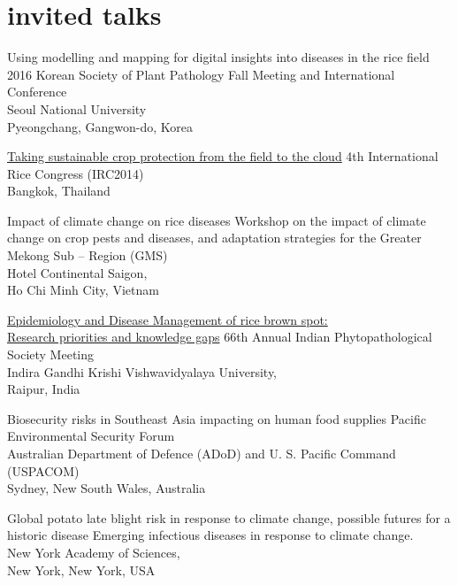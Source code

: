 \section*{invited talks}
\begin{entrylist}
 	{Using modelling and mapping for digital insights into diseases in the rice field}
 	{}
 	{2016 Korean Society of Plant Pathology Fall Meeting and International Conference\\Seoul National University\\Pyeongchang, Gangwon-do, Korea}

	{\href{http://figshare.com/articles/Taking_Sustainable_Crop_Protection_From_the_Field_to_the_Cloud/1225800}{Taking sustainable crop protection from the field to the cloud}}
	{}
	{4th International Rice Congress (IRC2014)\\Bangkok, Thailand}

	{Impact of climate change on rice diseases}
	{}
	{Workshop on the impact of climate change on crop pests and diseases, and adaptation strategies for the Greater Mekong Sub -- Region (GMS)\\Hotel Continental Saigon,\\Ho Chi Minh City, Vietnam}

	{\href{http://figshare.com/articles/IPS_2014/1037569}{Epidemiology and Disease Management of rice brown spot:\\Research priorities and knowledge gaps}}
	{}
	{66th Annual Indian Phytopathological Society Meeting\\Indira Gandhi Krishi Vishwavidyalaya University,\\Raipur, India}

	{Biosecurity risks in Southeast Asia impacting on human food supplies}
	{}
	{Pacific Environmental Security Forum\\Australian Department of Defence (ADoD) and U. S. Pacific Command (USPACOM)\\Sydney, New South Wales, Australia}

	{Global potato late blight risk in response to climate change, possible futures for a historic disease}
  	{}
  	{Emerging infectious diseases in response to climate change.\\New York Academy of Sciences,\\New York, New York, USA}
\end{entrylist}
